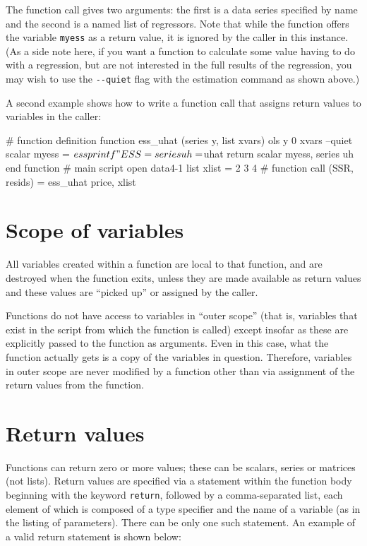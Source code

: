 The function call gives two arguments: the first is a data series
specified by name and the second is a named list of regressors.  Note
that while the function offers the variable \verb+myess+ as a return
value, it is ignored by the caller in this instance.  (As a side note
here, if you want a function to calculate some value having to do with
a regression, but are not interested in the full results of the
regression, you may wish to use the \verb+--quiet+ flag with the
estimation command as shown above.)
    
A second example shows how to write a function call that assigns
return values to variables in the caller:
    
\begin{code}
      # function definition
      function ess_uhat (series y, list xvars)
        ols y 0 xvars --quiet
        scalar myess = $ess
        printf "ESS = %
        series uh = $uhat
        return scalar myess, series uh
      end function
      # main script
      open data4-1
      list xlist = 2 3 4
      # function call
      (SSR, resids) = ess_uhat price, xlist
\end{code}


\section{Scope of variables}
\label{func-scope}

All variables created within a function are local to that function,
and are destroyed when the function exits, unless they are made
available as return values and these values are ``picked up'' or
assigned by the caller.
    
Functions do not have access to variables in ``outer scope'' (that is,
variables that exist in the script from which the function is called)
except insofar as these are explicitly passed to the function as
arguments.  Even in this case, what the function actually gets is a
copy of the variables in question.  Therefore, variables in outer
scope are never modified by a function other than via assignment of
the return values from the function.
    

\section{Return values}
\label{func-return}

Functions can return zero or more values; these can be scalars, series
or matrices (not lists).  Return values are specified via a statement
within the function body beginning with the keyword \verb+return+,
followed by a comma-separated list, each element of which is composed
of a type specifier and the name of a variable (as in the listing of
parameters).  There can be only one such statement.  An example of a
valid return statement is shown below:
    
